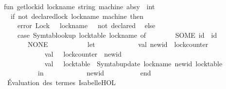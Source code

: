 \begin{isabellebody}
\isanewline
fun\ get{\isacharunderscore}{\kern0pt}lock{\isacharunderscore}{\kern0pt}id\ {\isacharparenleft}{\kern0pt}lock{\isacharunderscore}{\kern0pt}name{\isacharcolon}{\kern0pt}\ string{\isacharparenright}{\kern0pt}\ {\isacharparenleft}{\kern0pt}machine{\isacharcolon}{\kern0pt}\ absy{\isacharparenright}{\kern0pt}\ {\isacharcolon}{\kern0pt}\ int\ {\isacharequal}{\kern0pt}\isanewline
\ \ if\ not\ {\isacharparenleft}{\kern0pt}declared{\isacharunderscore}{\kern0pt}lock\ lock{\isacharunderscore}{\kern0pt}name\ machine{\isacharparenright}{\kern0pt}\ then\isanewline
\ \ \ \ error\ {\isacharparenleft}{\kern0pt}{\isachardoublequote}{\kern0pt}Lock\ {\isachardoublequote}{\kern0pt}\ {\isacharcircum}{\kern0pt}\ lock{\isacharunderscore}{\kern0pt}name\ {\isacharcircum}{\kern0pt}\ {\isachardoublequote}{\kern0pt}\ not\ declared{\isachardoublequote}{\kern0pt}{\isacharparenright}{\kern0pt}\isanewline
\ \ else\isanewline
\ \ \ \ case\ Symtab{\isachardot}{\kern0pt}lookup\ {\isacharparenleft}{\kern0pt}{\isacharbang}{\kern0pt}lock{\isacharunderscore}{\kern0pt}table{\isacharparenright}{\kern0pt}\ lock{\isacharunderscore}{\kern0pt}name\ of\isanewline
\ \ \ \ \ \ \ \ SOME\ id\ {\isacharequal}{\kern0pt}{\isachargreater}{\kern0pt}\ id\isanewline
\ \ \ \ \ \ {\isacharbar}{\kern0pt}\ NONE\ {\isacharequal}{\kern0pt}{\isachargreater}{\kern0pt}\isanewline
\ \ \ \ \ \ \ \ \ \ let\isanewline
\ \ \ \ \ \ \ \ \ \ \ \ val\ new{\isacharunderscore}{\kern0pt}id\ {\isacharequal}{\kern0pt}\ {\isacharbang}{\kern0pt}lock{\isacharunderscore}{\kern0pt}counter\isanewline
\ \ \ \ \ \ \ \ \ \ \ \ val\ {\isacharunderscore}{\kern0pt}\ {\isacharequal}{\kern0pt}\ lock{\isacharunderscore}{\kern0pt}counter\ {\isacharcolon}{\kern0pt}{\isacharequal}{\kern0pt}\ new{\isacharunderscore}{\kern0pt}id\ {\isacharplus}{\kern0pt}\ {}\isanewline
\ \ \ \ \ \ \ \ \ \ \ \ val\ {\isacharunderscore}{\kern0pt}\ {\isacharequal}{\kern0pt}\ lock{\isacharunderscore}{\kern0pt}table\ {\isacharcolon}{\kern0pt}{\isacharequal}{\kern0pt}\ Symtab{\isachardot}{\kern0pt}update\ {\isacharparenleft}{\kern0pt}lock{\isacharunderscore}{\kern0pt}name{\isacharcomma}{\kern0pt}\ new{\isacharunderscore}{\kern0pt}id{\isacharparenright}{\kern0pt}\ {\isacharparenleft}{\kern0pt}{\isacharbang}{\kern0pt}lock{\isacharunderscore}{\kern0pt}table{\isacharparenright}{\kern0pt}\isanewline
\ \ \ \ \ \ \ \ \ \ in\isanewline
\ \ \ \ \ \ \ \ \ \ \ \ new{\isacharunderscore}{\kern0pt}id\isanewline
\ \ \ \ \ \ \ \ \ \ end{\isacharsemicolon}{\kern0pt}\isanewline
{\isacharparenleft}{\kern0pt}{\isacharasterisk}{\kern0pt}\ Évaluation\ des\ termes\ Isabelle{\isacharslash}{\kern0pt}HOL\ {\isacharasterisk}{\kern0pt}{\isacharparenright}{\kern0pt}\isanewline

\end{isabellebody}
